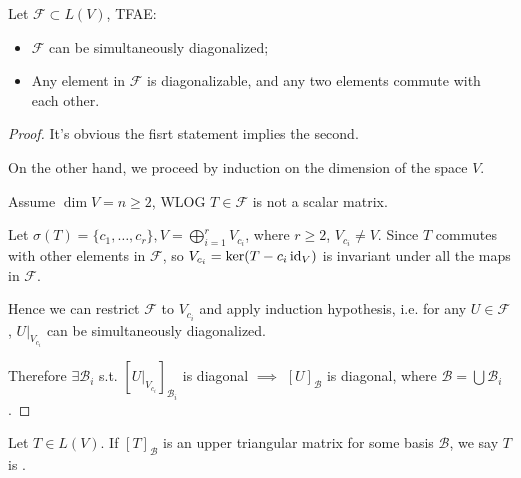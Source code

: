 \begin{proposition}
	Let $\mathcal{F} \subset L(V)$, TFAE:
	\begin{itemize}
		\item $\mathcal{F}$ can be simultaneously diagonalized;
		\item Any element in $\mathcal{F}$ is diagonalizable, and any two elements
			commute with each other.
	\end{itemize}
\end{proposition}
\begin{proof}[Proof]
    It's obvious the fisrt statement implies the second.

	On the other hand, we proceed by induction on the dimension of the space $V$.

	Assume  $\dim V = n\ge 2$, WLOG $T\in \mathcal{F}$ is not a scalar matrix.

	Let $\sigma(T)=\{c_1,\dots,c_r\}, V=\bigoplus_{i=1}^r V_{c_i}$, where $r\ge 2$,
	$V_{c_i}\ne V$.
	Since $T$ commutes with other elements in  $\mathcal{F}$,
	so $V_{c_i} = \ker(T - c_i\operatorname{id}_V)$ is invariant under all the maps in $\mathcal{F}$.

	Hence we can restrict $\mathcal{F}$ to $V_{c_i}$ and apply
	induction hypothesis, i.e. for any $U\in \mathcal{F}$, $U|_{V_{c_i}}$ can
	be simultaneously diagonalized.

	Therefore $\exists \mathcal{B}_i$ s.t. $[U|_{V_{c_i}}]_{\mathcal{B}_i}$ is diagonal
	$\implies$  $[U]_{\mathcal{B}}$ is diagonal, where $\mathcal{B}=\bigcup \mathcal{B}_i$.
\end{proof}

\begin{definition}
	Let $T\in L(V)$. If $[T]_{\mathcal{B}}$ is an upper
	triangular matrix for some basis $\mathcal{B}$,
	we say $T$ is .
\end{definition}

